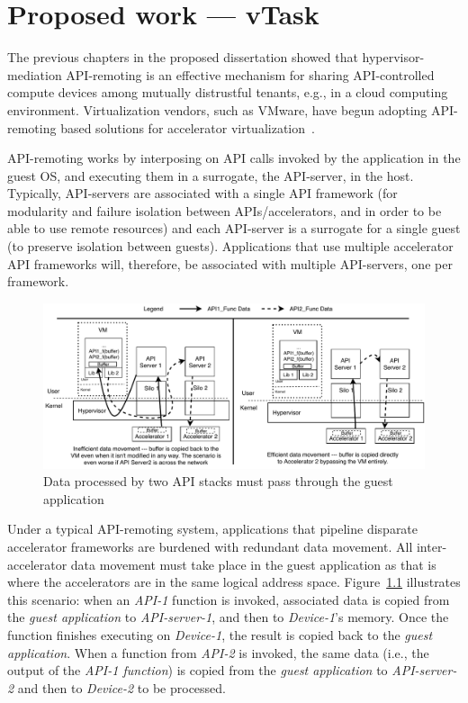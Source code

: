 \chapter{Proposed work --- vTask}
\label{sec:vTask}

The previous chapters in the proposed dissertation showed that
hypervisor-mediation API-remoting is an effective mechanism for sharing
API-controlled compute devices among mutually distrustful tenants, e.g., in a
cloud computing environment. Virtualization vendors, such as VMware, have
begun adopting API-remoting based solutions for accelerator virtualization~\cite{bitfusion-acquisition}.

API-remoting works by interposing on API calls invoked by the application in
the guest OS, and executing them in a surrogate, the API-server, in the host.
Typically, API-servers are associated with a single API framework (for
modularity and failure isolation between APIs/accelerators, and in order to be
able to use remote resources) and each API-server is a surrogate for a single
guest (to preserve isolation between guests). Applications that use multiple
accelerator API frameworks will, therefore, be associated with multiple
API-servers, one per framework.

\begin{figure}[ht!]
\centering
\captionsetup{justification=centering,width=\linewidth}
\includegraphics[width=\linewidth]{figures/vtask-overview.pdf}
\caption{Data processed by two API stacks must pass through the guest application}
\label{fig:vtask_overview}
\end{figure}

Under a typical API-remoting system, applications that pipeline disparate
accelerator frameworks are burdened with redundant data movement. All
inter-accelerator data movement must take place in the guest application as
that is where the accelerators are in the same logical address space.
Figure~\ref{fig:vtask_overview} illustrates this scenario: when an \emph{API-1}
function is invoked, associated data is copied from the
\emph{guest application} to \emph{API-server-1}, and then to \emph{Device-1}’s
memory. Once the function finishes executing on \emph{Device-1}, the result is
copied back to the \emph{guest application}. When a function from \emph{API-2}
is invoked, the same data (i.e., the output of the \emph{API-1 function}) is
copied from the \emph{guest application} to \emph{API-server-2} and then to
\emph{Device-2} to be processed.

